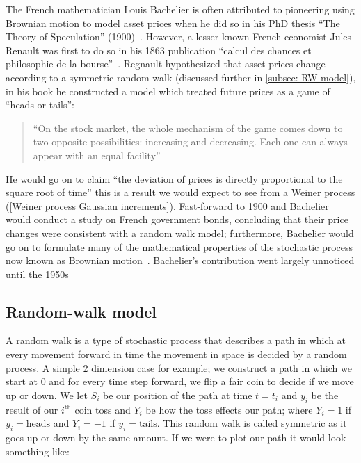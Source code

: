 The French mathematician Louis Bachelier is often attributed to pioneering using Brownian motion to model asset prices when he did so in his PhD thesis “The Theory of Speculation'' (1900)~\cite{Bachelier+2007}. However, a lesser known French economist Jules Renault was first to do so in his 1863 publication “calcul des chances et philosophie de la bourse''~\cite{RegnaultFirst}.
\nline{}
Regnault hypothesized that asset prices change according to a symmetric random walk (discussed further in \autoref{subsec: RW model}), in his book he constructed a model which treated future prices as a game of ``heads or tails'':
\begin{quotation}
    ``On the stock market, the whole mechanism of the game comes down to two opposite possibilities: increasing and decreasing. Each one can always appear with an equal facility'' \hfill{}\nolinebreak\cite{regnault1863calcul,RegnaultFirst}
\end{quotation}
He would go on to claim ``the deviation of prices is directly proportional to the square root of time'' this is a result we would expect to see from a Weiner process (\autoref{Weiner process Gaussian increments}). Fast-forward to 1900 and Bachelier would conduct a study on French government bonds, concluding that their price changes were consistent with a random walk model; furthermore, Bachelier would go on to formulate many of the mathematical properties of the stochastic process now known as Brownian motion~\cite{Bachelier+2007}. Bachelier's contribution went largely unnoticed until the 1950s

\subsection{Random-walk model}\label{subsec: RW model}

A random walk is a type of stochastic process that describes a path in which at every movement forward in time the movement in space is decided by a random process. A simple 2 dimension case for example; we construct a path in which we start at 0 and for every time step forward, we flip a fair coin to decide if we move up or down. We let \( S_i \) be our position of the path at time \( t = t_i \) and \(y_i\) be the result of our \( i^\text{th} \) coin toss and \( Y_i \) be how the toss effects our path; where \( Y_i = 1 \) if \( y_i = \text{heads} \) and \(Y_i = -1\) if \( y_i = \text{tails} \). This random walk is called symmetric as it goes up or down by the same amount. If we were to plot our path it would look something like:

